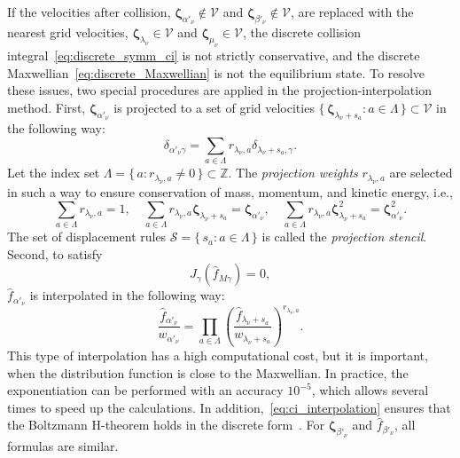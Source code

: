 \documentclass[]{elsarticle} %
\newcommand{\bzeta}{\boldsymbol{\zeta}}
\newcommand{\Set}[2]{\{\,{#1}:{#2}\,\}}
\begin{document}
If the velocities after collision,
\(\bzeta_{\alpha'_\nu}\notin\mathcal{V}\) and \(\bzeta_{\beta'_\nu}\notin\mathcal{V}\),
are replaced with the nearest grid velocities,
\(\bzeta_{\lambda_\nu}\in\mathcal{V}\) and \(\bzeta_{\mu_\nu}\in\mathcal{V}\),
the discrete collision integral~\eqref{eq:discrete_symm_ci} is not strictly conservative,
and the discrete Maxwellian~\eqref{eq:discrete_Maxwellian} is not the equilibrium state.
To resolve these issues, two special procedures are applied in the projection-interpolation method.
First, \(\bzeta_{\alpha'_\nu}\) is projected to a set of grid velocities
\(\Set{\bzeta_{\lambda_\nu+s_a}}{a\in\Lambda}\subset\mathcal{V}\) in the following way:
\begin{equation}\label{eq:ci_projection}
    \delta_{\alpha'_\nu\gamma} = \sum_{a\in\Lambda} r_{\lambda_\nu,a}\delta_{\lambda_\nu+s_a,\gamma}.
\end{equation}
Let the index set \(\Lambda = \Set{a}{r_{\lambda_\nu,a}\neq0}\subset\mathbb{Z}\).
The \emph{projection weights} \(r_{\lambda_\nu,a}\) are selected in such a way
to ensure conservation of mass, momentum, and kinetic energy, i.e.,
\begin{equation}\label{eq:stencil_conservation}
    \sum_{a\in\Lambda} r_{\lambda_\nu,a} = 1, \quad
    \sum_{a\in\Lambda} r_{\lambda_\nu,a} \bzeta_{\lambda_\nu+s_a} = \bzeta_{\alpha'_\nu}, \quad
    \sum_{a\in\Lambda} r_{\lambda_\nu,a} \bzeta_{\lambda_\nu+s_a}^2 = \bzeta_{\alpha'_\nu}^2.
\end{equation}
The set of displacement rules \(\mathcal{S} = \Set{s_a}{a\in\Lambda}\)
is called the \emph{projection stencil}.
Second, to satisfy
\begin{equation}\label{eq:strict_interpolation}
    J_\gamma\left(\hat{f}_{M\gamma}\right) = 0,
\end{equation}
\(\hat{f}_{\alpha'_\nu}\) is interpolated in the following way:
\begin{equation}\label{eq:ci_interpolation}
    \frac{\hat{f}_{\alpha'_\nu}}{w_{\alpha'_\nu}} = \prod_{a\in\Lambda}
        \left(\frac{\hat{f}_{\lambda_\nu+s_a}}{w_{\lambda_\nu+s_a}} \right)^{r_{\lambda_\nu,a}}.
\end{equation}
This type of interpolation has a high computational cost, but it is important,
when the distribution function is close to the Maxwellian.
In practice, the exponentiation can be performed with an accuracy \(10^{-5}\),
which allows several times to speed up the calculations.
In addition,~\eqref{eq:ci_interpolation} ensures that
the Boltzmann H-theorem holds in the discrete form~\citep{Dodulad2013}.
For \(\bzeta_{\beta'_\nu}\) and \(\hat{f}_{\beta'_\nu}\), all formulas are similar.
\end{document}
